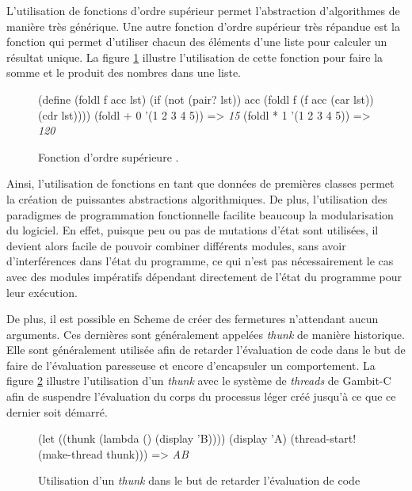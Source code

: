\documentclass[12pt,oneside,letterpaper,francais]{book}
\newcommand{\scheme}[1]{\selectlanguage{english}{\tt #1}\selectlanguage{french}}
\newcommand{\schemeresult}[1]{{\it #1}}
\begin{document}
L'utilisation de fonctions d'ordre supérieur permet l'abstraction
d'algorithmes de manière très générique. Une autre fonction d'ordre
supérieur très répandue est la fonction \scheme{foldl} qui permet
d'utiliser chacun des éléments d'une liste pour calculer un résultat
unique. La figure \ref{Scheme:fold} illustre l'utilisation de cette
fonction pour faire la somme et le produit des nombres dans une
liste.

\begin{figure}[htb!]
  \begin{schemecode}
(define (foldl f acc lst)
    (if (not (pair? lst))
        acc
        (foldl f (f acc (car lst)) (cdr lst))))
(foldl + 0 '(1 2 3 4 5)) => \schemeresult{15}
(foldl * 1 '(1 2 3 4 5)) => \schemeresult{120}
  \end{schemecode}
  \caption{Fonction d'ordre supérieure \scheme{foldl}.}
  \label{Scheme:fold}
\end{figure}

Ainsi, l'utilisation de fonctions en tant que données de premières
classes permet la création de puissantes abstractions
algorithmiques. De plus, l'utilisation des paradigmes de programmation
fonctionnelle facilite beaucoup la modularisation du logiciel. En
effet, puisque peu ou pas de mutations d'état sont utilisées, il
devient alors facile de pouvoir combiner différents modules, sans
avoir d'interférences dans l'état du programme, ce qui n'est pas
nécessairement le cas avec des modules impératifs dépendant
directement de l'état du programme pour leur exécution.

De plus, il est possible en Scheme de créer des fermetures n'attendant
aucun arguments. Ces dernières sont généralement appelées
\textit{thunk} de manière historique. Elle sont généralement utilisée
afin de retarder l'évaluation de code dans le but de faire de
l'évaluation paresseuse et encore d'encapsuler un comportement. La
figure \ref{Scheme:thunk} illustre l'utilisation d'un \textit{thunk}
avec le système de \textit{threads} de Gambit-C afin de suspendre
l'évaluation du corps du processus léger créé jusqu'à ce que ce dernier soit démarré.

\begin{figure}[htb!]
  \begin{schemecode}
(let ((thunk (lambda () (display 'B))))
  (display 'A)
  (thread-start! (make-thread thunk))) => \schemeresult{AB}
  \end{schemecode}
  \caption{Utilisation d'un \textit{thunk} dans le but de retarder
    l'évaluation de code}
  \label{Scheme:thunk}
\end{figure}
\end{document}
